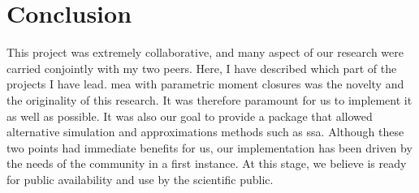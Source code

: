 \section{Conclusion}
This project was extremely collaborative, and many aspect of our research were carried conjointly with my two peers.
Here, I have described which part of the projects I have lead.
\gls{mea} with parametric moment closures was the novelty and the originality of this research.
It was therefore paramount for us to implement it as well as possible.
It was also our goal to provide a package that allowed alternative simulation and approximations methods such as \gls{ssa}.
Although these two points had immediate benefits for us, our implementation has been driven by the needs of the community in a first instance.
At this stage, we believe \means{} is ready for public availability and use by the scientific public.